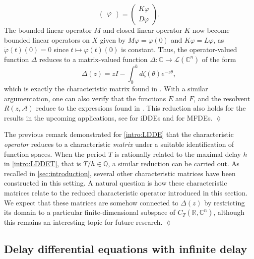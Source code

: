 \documentclass[english]{myarticle}
\begin{document}
\begin{sloppypar}
\begin{remark}
\begin{equation*}
\begin{pmatrix}
        \varphi
    \end{pmatrix}
    =
    \begin{pmatrix}
        K \varphi \\
        D\varphi
    \end{pmatrix}.
\end{equation*}
The bounded linear operator $M$ and closed linear operator $K$ now become bounded linear operators on $X$ given by $M \varphi = \varphi(0)$ and $K \varphi = L \varphi$, as $\dot{\varphi}(t)(0) = 0$ since $t \mapsto \varphi(t)(0)$ is constant. Thus, the operator-valued function $\Delta$ reduces to a matrix-valued function $\Delta : \mathbb{C} \to \mathcal{L}(\mathbb{C}^n)$ of the form
\begin{equation*}
    \Delta(z) = zI - \int_0^h d\zeta(\theta)e^{-z \theta},
\end{equation*}
which is exactly the characteristic matrix found in \cite[Section II.1.1]{Kaashoek1992}. With a similar argumentation, one can also verify that the functions $E$ and $F$, and the resolvent $R(z,\mathcal{A})$ reduce to the expressions found in \cite[Section II.1.1]{Kaashoek1992}. This reduction also holds for the results in the upcoming applications, see \cite[Section II.1.3]{Kaashoek1992} for iDDEs and \cite[Section 4]{Hupkes2008} for MFDEs.
\hfill $\lozenge$
\end{remark}

\begin{remark} \label{remark:charoperatorTh}
The previous remark demonstrated for \eqref{intro:LDDE} that the characteristic \emph{operator} reduces to a characteristic \emph{matrix} under a suitable identification of function spaces. When the period $T$ is rationally related to the maximal delay $h$ in \eqref{intro:LDDET}, that is $T/h \in \mathbb{Q}$, a similar reduction can be carried out. As recalled in \cref{sec:introduction}, several other characteristic matrices have been constructed in this setting. A natural question is how these characteristic matrices relate to the reduced characteristic operator introduced in this section. We expect that these matrices are somehow connected to $\Delta(z)$ by restricting its domain to a particular finite-dimensional subspace of $C_T(\mathbb{R},\mathbb{C}^n)$, although this remains an interesting topic for future research. \hfill $\lozenge$
\end{remark}

\subsection{Delay differential equations with infinite delay} \label{subsec:infinitedelay}


\end{sloppypar}
\end{document}
